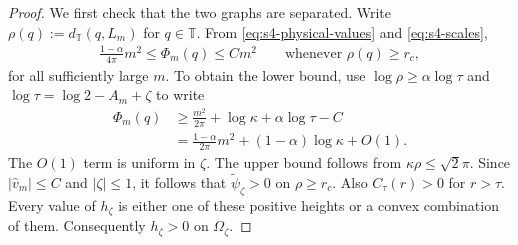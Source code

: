 \documentclass[a4paper,11pt,oneside,reqno]{amsart}
\numberwithin{equation}{section}
\theoremstyle{definition}
\begin{document}
\begin{proof}
    We first check that the two graphs are separated.
    Write $\rho(q):=d_{\mathbb T}(q,L_m)$ for
    $q\in\mathbb T$. From
    \eqref{eq:s4-physical-values} and \eqref{eq:s4-scales},
    \begin{align}
        \label{eq:s4-truncated-positivity}
        \frac{1-\alpha}{4\pi}m^2
        \leq\Phi_m(q)\leq Cm^2
        \qquad\text{whenever }\rho(q)\geq r_c,
    \end{align}
    for all sufficiently large $m$. To obtain the lower
    bound, use $\log\rho\geq\alpha\log\tau$ and
    $\log\tau=\log2-A_m+\zeta$ to write
    \begin{align*}
        \Phi_m(q)
        &\geq\frac{m^2}{2\pi}+\log\kappa
                     +\alpha\log\tau-C\\
        &=\frac{1-\alpha}{2\pi}m^2
                     +(1-\alpha)\log\kappa+O(1).
    \end{align*}
    The $O(1)$ term is uniform in $\zeta$. The upper
    bound follows from $\kappa\rho\leq\sqrt2\pi$.
    Since $|\widehat v_m|\leq C$ and $|\zeta|\leq1$,
    it follows that $\widetilde\psi_\zeta>0$ on
    $\rho\geq r_c$. Also $C_\tau(r)>0$ for $r>\tau$.
    Every value of $h_\zeta$ is either one of these
    positive heights or a convex combination of them.
    Consequently $h_\zeta>0$ on $\Omega_\zeta$.


\end{proof}
\end{document}
